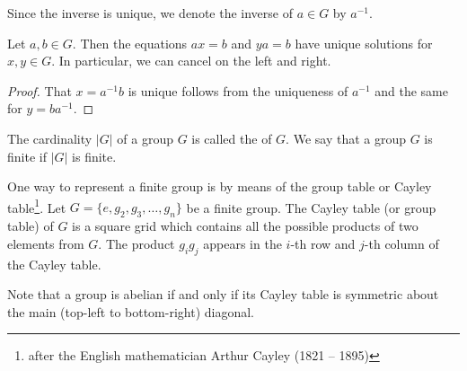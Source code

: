\begin{notation}
Since the inverse is unique, we denote the inverse of $a\in G$ by $a^{-1}$.
\end{notation}

\begin{proposition}
Let $a,b\in G$. Then the equations $ax=b$ and $ya=b$ have unique solutions for $x,y\in G$. In particular, we can cancel on the left and right.
\end{proposition}

\begin{proof}
That $x=a^{-1}b$ is unique follows from the uniqueness of $a^{-1}$ and the same for $y=ba^{-1}$.
\end{proof}

\begin{definition}
The cardinality $|G|$ of a group $G$ is called the  of $G$. We say that a group $G$ is finite if $|G|$ is finite.
\end{definition}

One way to represent a finite group is by means of the group table or Cayley table\footnote{after
the English mathematician Arthur Cayley (1821 -- 1895)}. Let $G=\{e,g_2,g_3,\dots,g_n\}$ be a finite group. The Cayley table (or group table) of $G$ is a square grid which contains all the possible products of two elements from $G$. The product $g_ig_j$ appears in the $i$-th row and $j$-th column of the Cayley table.

\begin{remark}
Note that a group is abelian if and only if its Cayley table is symmetric about the main (top-left to bottom-right) diagonal.
\end{remark}

